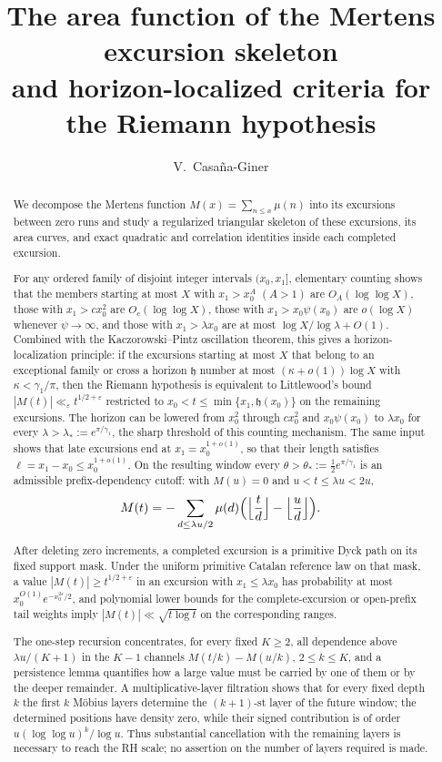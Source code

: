 \documentclass[11pt]{amsart}
\title[The Mertens excursion skeleton]{The area function of the Mertens excursion skeleton\\
and horizon-localized criteria for the Riemann hypothesis}
\author{V.~Casa\~na-Giner}
\date{}
\numberwithin{equation}{section}
\theoremstyle{plain}
\theoremstyle{definition}
\theoremstyle{remark}
\newcommand{\eps}{\varepsilon}
\begin{document}
\begin{abstract}
We decompose the Mertens function $M(x)=\sum_{n\le x}\mu(n)$ into its
excursions between zero runs and study a regularized triangular skeleton of
these excursions, its area curves, and exact quadratic and correlation
identities inside each completed excursion.

For any ordered family of disjoint integer intervals $(x_0,x_1]$, elementary
counting shows that the members starting at most $X$ with $x_1>x_0^A$
$(A>1)$ are $O_A(\log\log X)$, those with $x_1>cx_0^2$ are
$O_c(\log\log X)$, those with $x_1>x_0\psi(x_0)$ are $o(\log X)$ whenever
$\psi\to\infty$, and those with $x_1>\lambda x_0$ are at most
$\log X/\log\lambda+O(1)$. Combined with the Kaczorowski--Pintz oscillation
theorem, this gives a horizon-localization principle: if the excursions
starting at most $X$ that belong to an exceptional family or cross a horizon
$\mathfrak h$ number at most $(\kappa+o(1))\log X$ with $\kappa<\gamma_1/\pi$,
then the Riemann hypothesis is equivalent to Littlewood's bound
$|M(t)|\ll_\eps t^{1/2+\eps}$ restricted to $x_0<t\le\min\{x_1,\mathfrak h(x_0)\}$
on the remaining excursions. The horizon can be lowered from $x_0^2$ through
$cx_0^2$ and $x_0\psi(x_0)$ to $\lambda x_0$ for every
$\lambda>\lambda_*:=e^{\pi/\gamma_1}$, the sharp threshold of this counting
mechanism. The same input shows that late excursions end at
$x_1=x_0^{1+o(1)}$, so that their length satisfies $\ell=x_1-x_0\le x_0^{1+o(1)}$. On the resulting window every $\theta>\theta_*:=\frac12e^{\pi/\gamma_1}$
is an admissible prefix-dependency cutoff: with $M(u)=0$ and
$u<t\le\lambda u<2u$,
\[
M(t)=-\sum_{d\le\lambda u/2}\mu(d)
\Bigl(\Bigl\lfloor\frac td\Bigr\rfloor-\Bigl\lfloor\frac ud\Bigr\rfloor\Bigr).
\]

After deleting zero increments, a completed excursion is a primitive Dyck
path on its fixed support mask. Under the uniform primitive Catalan
reference law on that mask, a value $|M(t)|\ge t^{1/2+\eps}$ in an excursion
with $x_1\le\lambda x_0$ has probability at most $x_0^{O(1)}e^{-x_0^{2\eps}/2}$,
and polynomial lower bounds for the complete-excursion or open-prefix tail
weights imply $|M(t)|\ll\sqrt{t\log t}$ on the corresponding ranges.

The one-step recursion concentrates, for every fixed $K\ge2$, all dependence
above $\lambda u/(K+1)$ in the $K-1$ channels $M(t/k)-M(u/k)$, $2\le k\le K$,
and a persistence lemma quantifies how a large value must be carried by one
of them or by the deeper remainder. A multiplicative-layer filtration shows
that for every fixed depth $k$ the first $k$ M\"obius layers determine the
$(k+1)$-st layer of the future window; the determined positions have density
zero, while their signed contribution is of order $u(\log\log u)^k/\log u$.
Thus substantial cancellation with the remaining layers is necessary to
reach the RH scale; no assertion on the number of layers required is made.


\end{abstract}
\end{document}
